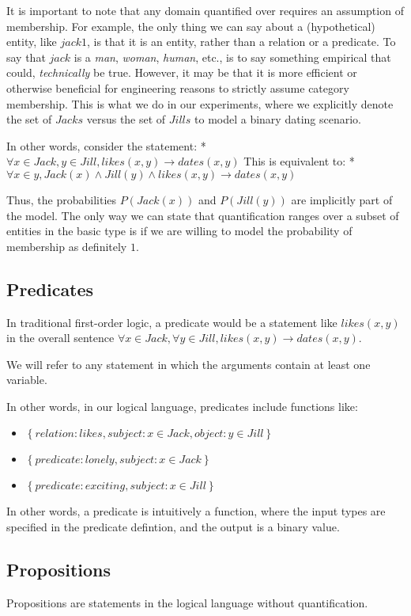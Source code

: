 \documentclass[12pt]{article}
\begin{document}
It is important to note that any domain quantified over requires an assumption of membership.
For example, the only thing we can say about a (hypothetical) entity, like \( jack1 \), is that it is an entity, rather than a relation or a predicate.
To say that \( jack \) is a \emph{man}, \emph{woman}, \emph{human}, etc., is to say something empirical that could, \emph{technically} be true.
However, it may be that it is more efficient or otherwise beneficial for engineering reasons to strictly assume category membership.
This is what we do in our experiments, where we explicitly denote the set of \( Jacks \) versus the set of \( Jills \) to model a binary dating scenario.

In other words, consider the statement:
* $\forall x \in Jack, y \in Jill, likes(x, y) \rightarrow dates(x, y)$
This is equivalent to:
* $\forall x \in  y, Jack(x) \wedge Jill(y) \wedge likes(x, y) \rightarrow dates(x, y)$

Thus, the probabilities $P(Jack(x))$ and $P(Jill(y))$ are implicitly part of the model.
The only way we can state that quantification ranges over a subset of entities in the basic type is if we are willing to model the probability of membership as definitely $1$.

\subsection{Predicates}
In traditional first-order logic, a predicate would be a statement like $likes(x, y)$ in the overall sentence $\forall x\in Jack, \forall y \in Jill, likes(x,y) \rightarrow dates(x, y)$.

We will refer to any statement in which the arguments contain at least one variable.

In other words, in our logical language, predicates include functions like:
\begin{itemize}
\item $\left\{relation:likes, subject:{x \in Jack}, object:{y \in Jill} \right\}$
\item $\left\{predicate:lonely, subject:{x \in Jack} \right\}$
\item $\left\{predicate:exciting, subject:{x \in Jill} \right\}$
\end{itemize}

In other words, a predicate is intuitively a function, where the input types are specified in the predicate defintion, and the output is a binary value.


\subsection{Propositions}
Propositions are statements in the logical language without quantification.
\end{document}
